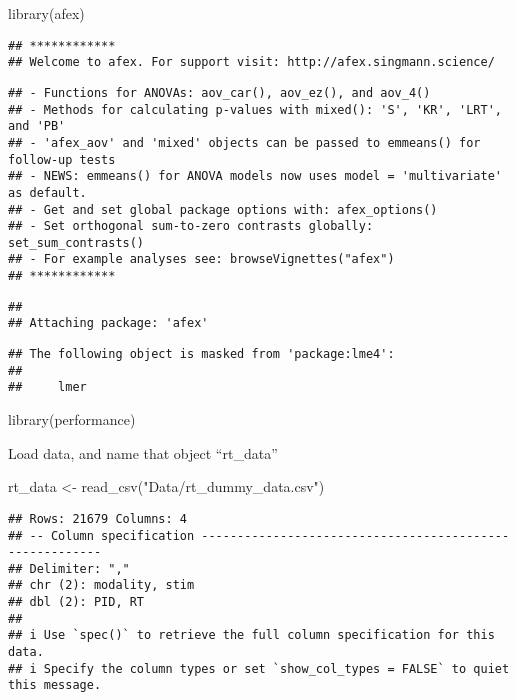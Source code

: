 \documentclass[
]{article}
\newenvironment{Shaded}{\begin{snugshade}}{\end{snugshade}}
\newcommand{\FunctionTok}[1]{\textcolor[rgb]{0.00,0.00,0.00}{#1}}
\newcommand{\NormalTok}[1]{#1}
\newcommand{\OtherTok}[1]{\textcolor[rgb]{0.56,0.35,0.01}{#1}}
\newcommand{\StringTok}[1]{\textcolor[rgb]{0.31,0.60,0.02}{#1}}
\begin{document}
\begin{Shaded}
\begin{Highlighting}[]
\FunctionTok{library}\NormalTok{(afex)}
\end{Highlighting}
\end{Shaded}

\begin{verbatim}
## ************
## Welcome to afex. For support visit: http://afex.singmann.science/
\end{verbatim}

\begin{verbatim}
## - Functions for ANOVAs: aov_car(), aov_ez(), and aov_4()
## - Methods for calculating p-values with mixed(): 'S', 'KR', 'LRT', and 'PB'
## - 'afex_aov' and 'mixed' objects can be passed to emmeans() for follow-up tests
## - NEWS: emmeans() for ANOVA models now uses model = 'multivariate' as default.
## - Get and set global package options with: afex_options()
## - Set orthogonal sum-to-zero contrasts globally: set_sum_contrasts()
## - For example analyses see: browseVignettes("afex")
## ************
\end{verbatim}

\begin{verbatim}
## 
## Attaching package: 'afex'
\end{verbatim}

\begin{verbatim}
## The following object is masked from 'package:lme4':
## 
##     lmer
\end{verbatim}

\begin{Shaded}
\begin{Highlighting}[]
\FunctionTok{library}\NormalTok{(performance)}
\end{Highlighting}
\end{Shaded}

Load data, and name that object ``rt\_data''

\begin{Shaded}
\begin{Highlighting}[]
\NormalTok{rt\_data }\OtherTok{\textless{}{-}} \FunctionTok{read\_csv}\NormalTok{(}\StringTok{"Data/rt\_dummy\_data.csv"}\NormalTok{)}
\end{Highlighting}
\end{Shaded}

\begin{verbatim}
## Rows: 21679 Columns: 4
## -- Column specification --------------------------------------------------------
## Delimiter: ","
## chr (2): modality, stim
## dbl (2): PID, RT
## 
## i Use `spec()` to retrieve the full column specification for this data.
## i Specify the column types or set `show_col_types = FALSE` to quiet this message.
\end{verbatim}
\end{document}
